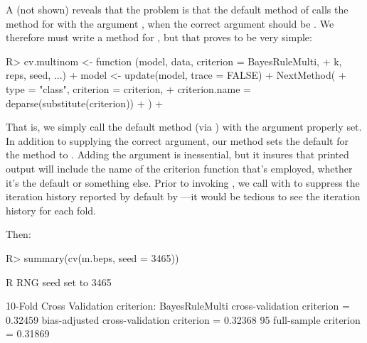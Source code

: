\documentclass[
]{jss}
\begin{document}
A  (not shown) reveals that the problem is that the
default method of  calls the  method for
 with the argument , when the
correct argument should be . We therefore must write
a  method for , but that proves to be very
simple:

\begin{CodeChunk}
\begin{CodeInput}
R> cv.multinom <- function (model, data, criterion = BayesRuleMulti,
+                          k, reps, seed, ...) {
+     model <- update(model, trace = FALSE)
+     NextMethod(
+       type = "class", criterion = criterion,
+       criterion.name = deparse(substitute(criterion))
+     )
+   }
\end{CodeInput}
\end{CodeChunk}

That is, we simply call the default  method (via
) with the  argument properly set. In
addition to supplying the correct  argument, our method sets
the default  for the  method to
. Adding the argument
 is inessential,
but it insures that printed output will include the name of the
criterion function that's employed, whether it's the default
 or something else. Prior to invoking
, we call  with 
to suppress the iteration history reported by default by
---it would be tedious to see the iteration history for
each fold.

Then:

\begin{CodeChunk}
\begin{CodeInput}
R> summary(cv(m.beps, seed = 3465))
\end{CodeInput}
\begin{CodeOutput}
R RNG seed set to 3465
\end{CodeOutput}
\begin{CodeOutput}
10-Fold Cross Validation
criterion: BayesRuleMulti
cross-validation criterion = 0.32459
bias-adjusted cross-validation criterion = 0.32368
95%
full-sample criterion = 0.31869
\end{CodeOutput}
\end{CodeChunk}
\end{document}
